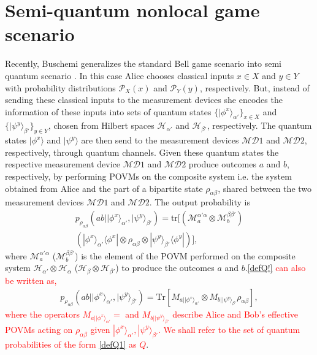 \documentclass[doublecol,linenumbers]{epl2} %
\begin{document}
\section{Semi-quantum nonlocal game scenario}\label{sec3}
Recently, Buschemi generalizes the standard Bell game scenario into semi quantum scenario \cite{Buscemi}. In this case Alice chooses classical inputs $x\in X$ and $y\in Y$ with probability distributions $\mathcal{P}_X(x)$ and $\mathcal{P}_Y(y)$, respectively. But, instead of sending these classical inputs to the measurement devices she encodes the information of these inputs into sets of quantum states $\{|\phi^x\rangle_{\alpha'}\}_{x\in X}$ and $\{|\psi^y\rangle_{\beta'}\}_{y\in Y}$, chosen from Hilbert spaces $\mathcal{H}_{\alpha'}$ and $\mathcal{H}_{\beta'}$, respectively. The quantum states $|\phi^x\rangle$ and $|\psi^y\rangle$ are then send to the measurement devices $\mathcal{MD}1$ and $\mathcal{MD}2$, respectively, through quantum channels. Given these quantum states the respective measurement device $\mathcal{MD}1$ and $\mathcal{MD}2$ produce outcomes $a$  and $b$, respectively, by performing POVMs on the composite system i.e. the system obtained from Alice and the part of a bipartite state $\rho_{\alpha\beta}$, shared between the two measurement devices $\mathcal{MD}1$ and $\mathcal{MD}2$. The output probability  is 
\begin{eqnarray}\label{defQ!}
p_{\rho_{\alpha\beta}}(ab||\phi^x\rangle_{\alpha'},|\psi^y\rangle_{\beta'})
=\mbox{tr}[(\mathcal{M}^{\alpha'\alpha}_a\otimes \mathcal{M}^{\beta\beta'}_b)\nonumber\\
(|\phi^x\rangle_{\alpha'}\langle\phi^x|\otimes \rho_{\alpha\beta}\otimes |\psi^y\rangle_{\beta'}\langle\phi^y|)],
\end{eqnarray}  
where $\mathcal{M}^{\alpha'\alpha}_a$ ($\mathcal{M}^{\beta\beta'}_b$) is the element of the POVM performed on the composite system $\mathcal{H}_{\alpha'}\otimes \mathcal{H}_{\alpha}$ ($\mathcal{H}_{\beta}\otimes \mathcal{H}_{\beta'}$) to produce the outcomes $a$ and $b$.\textcolor{red}{\ref{defQ!} can also be written as,}
\begin{eqnarray}\label{defQ1}
p_{\rho_{\alpha\beta}}(ab||\phi^x\rangle_{\alpha'},|\psi^y\rangle_{\beta'})
=\mbox{Tr} [M_{a||\phi^x\rangle_{\alpha'}}\otimes M_{b||\psi^y\rangle_{\beta'}} \rho_{\alpha\beta}],
\end{eqnarray}
\textcolor{red}{where the operators $M_{a||\phi^x\rangle_{\alpha'}}=$ and $M_{b||\psi^y\rangle_{\beta'}}$ describe Alice and Bob’s effective POVMs acting on $\rho_{\alpha\beta}$ given $|\phi^x\rangle_{\alpha'},|\psi^y\rangle_{\beta'}$. We shall refer to the set of quantum probabilities of the form \ref{defQ1} as $Q$}.
\end{document}
